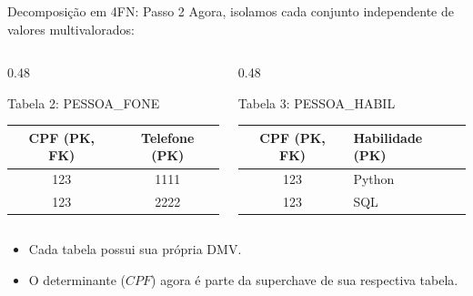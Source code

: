 \documentclass[9pt]{beamer}
\begin{document}
\begin{frame}{Decomposição em 4FN: Passo 2}
  \small
  Agora, isolamos cada conjunto independente de valores multivalorados:
  \vspace{0.3cm}
  \begin{columns}[t]
    \begin{column}{0.48\textwidth}
      \begin{exampleblock}{Tabela 2: PESSOA\_FONE}
        \centering
        \begin{tabular}{|c|c|}
          \hline
          \textbf{CPF (PK, FK)} & \textbf{Telefone (PK)} \\ \hline
          123 & 1111 \\ \hline
          123 & 2222 \\ \hline
        \end{tabular}
      \end{exampleblock}
    \end{column}
    \begin{column}{0.48\textwidth}
      \begin{exampleblock}{Tabela 3: PESSOA\_HABIL}
        \centering
        \begin{tabular}{|c|l|}
          \hline
          \textbf{CPF (PK, FK)} & \textbf{Habilidade (PK)} \\ \hline
          123 & Python \\ \hline
          123 & SQL \\ \hline
        \end{tabular}
      \end{exampleblock}
    \end{column}
  \end{columns}
  \vspace{0.3cm}
  \begin{itemize}
    \item Cada tabela possui sua própria DMV.
    \item O determinante ($CPF$) agora é parte da superchave de sua respectiva tabela.
  \end{itemize}
\end{frame}
\end{document}
